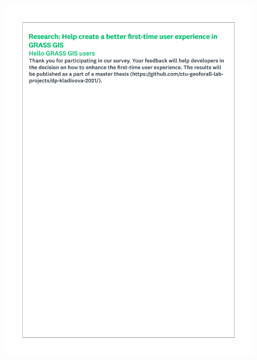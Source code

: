\documentclass[a4paper,10pt,twoside]{article}
\begin{document}
 \begin{figure}[hbt!]
 \begin{center}
 \includegraphics[width=12cm]{../surveys/questionnaires/survey1_part2_page1_intro.pdf}
 \end{center}
 \end{figure}
\end{document}
